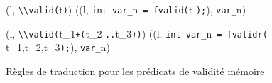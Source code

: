 \begin{figure*}[h!]
  \scriptsize{
    {
      {}
      {(l, \mbox{\lstinline'\\valid('}t\mbox{\lstinline')'}) \prule
        ((l, \mbox{\lstinline'int var_'}n~\mbox{\lstinline'= fvalid('}t
        \mbox{\lstinline');'}),
        \mbox{\lstinline'var_'}n)
      }{}
    }

    {
      {}
      {
        (l, \mbox{\lstinline'\\valid('}t_1\mbox{\lstinline'+('}t_2
        \mbox{\lstinline'..'}t_3\mbox{\lstinline'))'}) \prule
        ((l, \mbox{\lstinline'int var_'}n~\mbox{\lstinline'= fvalidr('}
        t_1,t_2,t_3\mbox{\lstinline');'}),
        \mbox{\lstinline'var_'}n)
      }{}
    }
  }
  \caption{Règles de traduction pour les prédicats de validité mémoire}
  \label{fig:valid}
\end{figure*}
